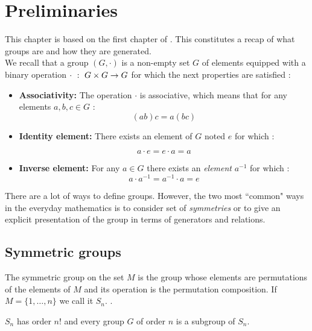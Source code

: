 \chapter{Preliminaries}

This chapter is based on the first chapter of \cite{magnusCombinatorialGroupTheory2004}. This constitutes a recap of what groups are and how they are generated.\\

We recall that a group $(G,\cdot)$ is a non-empty set $G$ of elements equipped with a binary operation $\cdot\text{ } :\text{ }  G \times G \rightarrow G$ for which the next properties are satisfied :

\begin{itemize}
  \item \textbf{Associativity:} The operation $\cdot$ is associative, which means that for any elements $a,b,c \in G$ :
    $$(ab)c = a(bc)$$

  \item \textbf{Identity element:} There exists an element of $G$ noted $e$ for which :

  $$a\cdot e = e\cdot a = a$$

  \item \textbf{Inverse element:} For any $a \in G$ there exists an \textit{element} $a^{-1}$ for which :
  $$ a\cdot a^{-1} = a^{-1} \cdot a = e $$
\end{itemize}

There are a lot of ways to define groups. However, the two most ``common" ways in the everyday mathematics is to consider set of \textit{symmetries} or to give an explicit presentation of the group in terms of generators and relations.

\section{Symmetric groups}

\begin{definition}
The symmetric group on the set $M$ is the group whose elements are permutations of the elements of $M$ and its operation is the permutation composition. If $M = \{1,\dots, n \}$ we call it $S_n$. \cite{saganSymmetricGroup2001}.
\end{definition}

\begin{proposition}$S_n$ has order $n!$ and every group $G$ of order $n$ is a subgroup of $S_n$.
\end{proposition}

